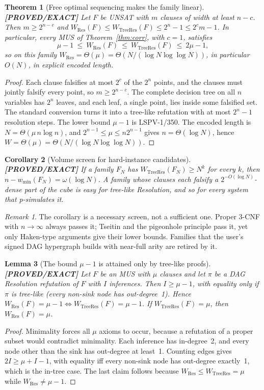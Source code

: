 \documentclass[11pt]{article}
\newtheorem{theorem}{Theorem}
\newtheorem{lemma}[theorem]{Lemma}
\newtheorem{corollary}[theorem]{Corollary}
\theoremstyle{remark}
\newtheorem*{remark}{Remark}
\newcommand{\status}[1]{\textbf{[#1]}}
\begin{document}
\begin{theorem}[Free optimal sequencing makes the family linear]\label{thm:lin}\status{PROVED/EXACT}
Let $F$ be UNSAT with $m$ clauses of width at least $n-c$. Then $m\ge 2^{n-c}$ and
$W_{\mathrm{Res}}(F)\le W_{\mathrm{TreeRes}}(F)\le 2^n-1\le 2^c m-1$. In particular, every MUS of
Theorem~\ref{thm:corr}, with $c=1$, satisfies
\[
 \mu-1\ \le\ W_{\mathrm{Res}}(F)\ \le\ W_{\mathrm{TreeRes}}(F)\ \le\ 2\mu-1 ,
\]
so on this family $W_{\mathrm{Res}}=\Theta(\mu)=\Theta(N/(\log N\log\log N))$, in particular $O(N)$, in
explicit encoded length.
\end{theorem}
\begin{proof}
Each clause falsifies at most $2^c$ of the $2^n$ points, and the clauses must jointly falsify every
point, so $m\ge 2^{n-c}$. The complete decision tree on all $n$ variables has $2^n$ leaves, and each
leaf, a single point, lies inside some falsified set. The standard conversion turns it into a
tree-like refutation with at most $2^n-1$ resolution steps. The lower bound $\mu-1$ is LSPV-1/350.
The encoded length is $N=\Theta(\mu\, n\log n)$, and $2^{n-1}\le\mu\le n2^{n-1}$ gives
$n=\Theta(\log N)$, hence $W=\Theta(\mu)=\Theta(N/(\log N\log\log N))$.
\end{proof}

\begin{corollary}[Volume screen for hard-instance candidates]\label{cor:screen}\status{PROVED/EXACT}
If a family $F_N$ has $W_{\mathrm{TreeRes}}(F_N)\ge N^{k}$ for every $k$, then
$n-w_{\min}(F_N)=\omega(\log N)$. A family whose clauses each falsify a $2^{-O(\log N)}$-dense part
of the cube is easy for tree-like Resolution, and so for every system that p-simulates it.
\end{corollary}
\begin{remark}
The corollary is a necessary screen, not a sufficient one. Proper 3-CNF with $n\to\infty$ always
passes it; Tseitin and the pigeonhole principle pass it, yet only Haken-type arguments give their
lower bounds. Families that the user's signed DAG hypergraph builds with near-full arity are retired
by it.
\end{remark}

\begin{lemma}[The bound $\mu-1$ is attained only by tree-like proofs]\label{lem:tight}\status{PROVED/EXACT}
Let $F$ be an MUS with $\mu$ clauses and let $\pi$ be a DAG Resolution refutation of $F$ with $I$
inferences. Then $I\ge\mu-1$, with equality only if $\pi$ is tree-like (every non-sink node has
out-degree~1). Hence $W_{\mathrm{Res}}(F)=\mu-1\iff W_{\mathrm{TreeRes}}(F)=\mu-1$. If
$W_{\mathrm{TreeRes}}(F)=\mu$, then $W_{\mathrm{Res}}(F)=\mu$.
\end{lemma}
\begin{proof}
Minimality forces all $\mu$ axioms to occur, because a refutation of a proper subset would contradict
minimality. Each inference has in-degree~2, and every node other than the sink has out-degree at
least~1. Counting edges gives $2I\ge \mu+I-1$, with equality iff every non-sink node has out-degree
exactly~1, which is the in-tree case. The last claim follows because $W_{\mathrm{Res}}\le
W_{\mathrm{TreeRes}}=\mu$ while $W_{\mathrm{Res}}\ne\mu-1$.
\end{proof}
\end{document}
